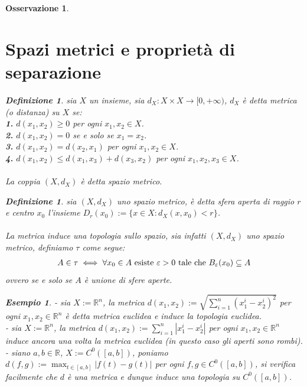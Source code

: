 \documentclass[oneside, 11pt]{amsbook}
\newcommand{\0}{{(0)}}
\newcommand{\3}{{(3)}}
\theoremstyle{colonplain}
\theoremstyle{colondefinition}
\newtheorem{defn}[thm]{Definizione}
\newtheorem{ex}[thm]{Esempio}
\theoremstyle{colonremark}
\newtheorem{rmk}[thm]{Osservazione}
\numberwithin{equation}{chapter}
\begin{document}
\begin{rmk}
\section{Spazi metrici e proprietà di separazione}
\begin{defn}
sia $X$ un insieme, sia $d_X : X \times X \longrightarrow [0, + \infty)$, $d_X$ è detta \textit{metrica} (o \textit{distanza}) su $X$ se: \\
\textbf{1.} $d(x_1, x_2) \geq 0$ per ogni $x_1, x_2 \in X$. \\
\textbf{2.} $d(x_1, x_2) = 0$ se e solo se $x_1 = x_2$. \\
\textbf{3.} $d(x_1, x_2) = d(x_2, x_1)$ per ogni $x_1, x_2 \in X$. \\
\textbf{4.} $d(x_1, x_2) \leq d(x_1, x_3) + d(x_3, x_2)$ per ogni $x_1, x_2, x_3 \in X$. \\ \\
La coppia $(X, d_X)$ è detta \textit{spazio metrico}.
\end{defn}
\begin{defn}
sia $(X, d_X)$ uno spazio metrico, è detta \textit{sfera aperta di raggio $r$ e centro $x_0$} l'insieme $D_r(x_0) := \{ x \in X : d_X(x, x_0) < r \}$. \\ \\
La metrica induce una topologia sullo spazio, sia infatti $(X, d_X)$ uno spazio metrico, definiamo $\tau$ come segue:
\begin{align}
    A \in \tau \iff \forall x_0 \in A \text{ esiste } \varepsilon > 0 \text{ tale che } B_\varepsilon(x_0) \subseteq A \notag
\end{align}
ovvero se e solo se $A$ è unione di sfere aperte.
\end{defn}
\begin{ex}
- sia $X := \mathbb{R}^n$, la metrica $d(x_1, x_2) := \sqrt{\sum_{i = 1}^n (x_1^i - x_2^i)^2}$ per ogni $x_1, x_2 \in \mathbb{R}^n$ è detta \textit{metrica euclidea} e induce la topologia euclidea. \\
- sia $X := \mathbb{R}^n$, la metrica $d(x_1, x_2) := \sum_{i = 1}^n |x_1^i - x_2^i|$ per ogni $x_1, x_2 \in \mathbb{R}^n$ induce ancora una volta la metrica euclidea (in questo caso gli aperti sono rombi). \\
- siano $a, b \in \mathbb{R}$, $X := C^0([a, b])$, poniamo $d(f, g) := \max_{t \in [a, b]} |f(t) - g(t)|$ per ogni $f, g \in C^0([a, b])$, si verifica facilmente che $d$ è una metrica e dunque induce una topologia su $C^0([a, b])$.
\end{ex}

\end{rmk}
\end{document}
